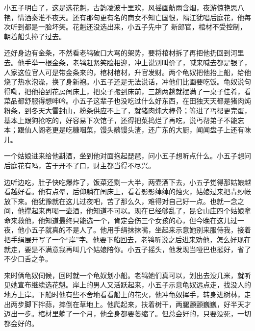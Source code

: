 小五子明白了，这是选花魁，古韵凌波十里欢，风摇画舫雨含烟，夜游惊艳思八艳，情洒秦淮不夜天。还有那句更有名的商女不知亡国恨，隔江犹唱后庭花，他每次听到都是一脸坏笑。花魁还没选出来，小五子先中了
新郎官，棺材不受控制，朝着船头撞了过去。

还好身边有金条，不然看老鸨破口大骂的架势，要将棺材拆了再把他扔回到河里去。他手举一根金条，老鸨赶紧笑脸相迎，冲上说别叫价了，喊来喊去都是银子，人家这位官人可是带金条来的，棺材棺材，升官发财。两个龟奴把他抬上船，给他烧了热水泡澡，换了身新袍。小五子还是无法说话，冲他们比画要吃饭。龟奴说句得嘞，把他抬到花房闺床上，把桌子搬到床前，三趟两趟就摆满了一桌子佳肴，看菜品都舒服得想呻吟。小五子这辈子也没吃过什么好东西，在田独天天都是猪肉炖粉条，到冬天大雪封山，粉条供应不上了，就猪肉炖大棒骨；等进了丐帮更完蛋，基本上跟狗抢吃的，好容易下次馆子，还得把菜捣烂了再吃，说丐帮弟子不能忘本；跟仙人阁老更是吃糠咽菜，馒头蘸馒头渣，还广东的大厨，闻闻盘子上还有味儿。

一个姑娘进来给他斟酒，坐到他对面抱起琵琶，问小五子想听点什么。小五子想问后庭花有吗，苦于开不了口，财主都当得不尽兴。

边听边吃，肚子快吃爆炸了，饭菜还剩一大半，两壶酒下去，小五子觉得那姑娘越看越好看。他有点晕，后仰躺在闺床上，看着影影绰绰的烛火，姑娘过来把青纱帐放下来。他犹豫就在这儿过夜吧，苦了那么久，难得对自己好一点。也就一念之间，他撑起来再喝一壶酒，他知道不可以。现在已经够乱了，昆仑山庄四个姑娘拿命来救他，他知道最终只能选一个，肯定会伤三个女孩的心，但今晚在这儿过一夜，他小五子就真的不是人了。他用手绢抹抹嘴，坐起来示意她别来服侍我，接着把手绢展开写了一个“岸”字。他要下船回去，老鸨听说之后进来劝他，怎么好现在就走，要是不满意我再叫几个姑娘陪你。小五子摇头，他发现当哑巴也挺好，省了不少口舌之争。

来时俩龟奴伺候，回时就一个龟奴划小船。老鸨她们真可以，划出去没几米，就听见她宣布继续选花魁。岸上的男人又活跃起来，小五子示意龟奴远点走，找没人的地方上岸。下船时他有些不舍地看看船上的花火，他冲龟奴挥手，转身进树林，走出两步脚下拌蒜，摔倒在草地上。他爬起来，扶着树干，两腿颤颤巍巍，好半天才迈出一步。棺材里躺了一个月，他全身都要萎缩了。但总会好的，只要没死，一切都会好的。

\newpage